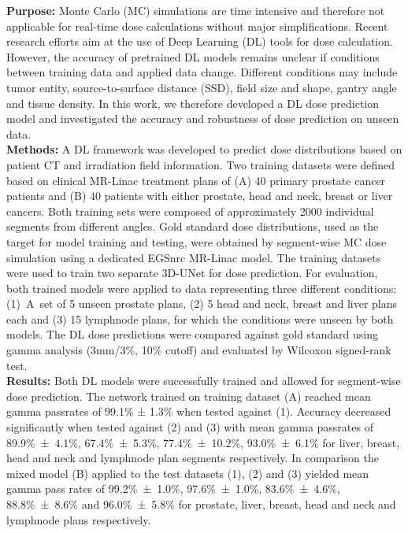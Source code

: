 
\textbf{Purpose:} Monte Carlo (MC) simulations are time intensive and therefore not applicable for real-time dose calculations without major simplifications.  Recent research efforts aim at the use of Deep Learning (DL) tools for dose calculation. 
However, the accuracy of pretrained DL models remains unclear if conditions between training data and applied data change.
Different conditions may include tumor entity, source-to-surface distance (SSD), field size and shape, gantry angle and tissue density. In this work, we therefore developed a DL dose prediction model and investigated the accuracy and robustness of dose prediction on unseen data.\\

\textbf{Methods:} A DL framework was developed to predict dose distributions based on patient CT and irradiation field information. 
Two training datasets were defined based on clinical MR-Linac treatment plans of (A) 40 primary prostate cancer patients and (B) 40 patients with either prostate, head and neck, breast or liver cancers. 
Both training sets were composed of approximately 2000 individual segments from different angles. 
Gold standard dose distributions, used as the target for model training and testing, were obtained by segment-wise MC dose simulation using a dedicated EGSnrc MR-Linac model. 
The training datasets were used to train two separate 3D-UNet for dose prediction. 
For evaluation, both trained models were applied to data representing three different conditions: (1)~A~set of 5 unseen prostate plans, (2) 5 head and neck, breast and liver plans each and (3) 15 lymphnode plans, for which the conditions were unseen by both models. 
The DL dose predictions were compared against gold standard using gamma analysis (3mm/3\%, 10\% cutoff) and evaluated by Wilcoxon signed-rank test.\\

\textbf{Results:} Both DL models were successfully trained and allowed for segment-wise dose prediction.
The network trained on training dataset (A) reached mean gamma passrates of  99.1\% ± 1.3\% when tested against (1).
Accuracy decreased significantly when tested against (2) and (3) with mean gamma passrates of 89.9\%~±~4.1\%, 67.4\%~±~5.3\%, 77.4\%~±~10.2\%, 93.0\%~±~6.1\% for liver, breast, head and neck and lymphnode plan segments respectively.
In comparison the mixed model (B) applied to the test datasets (1), (2) and (3) yielded mean gamma pass rates of 99.2\%~±~1.0\%, 97.6\%~±~1.0\%, 83.6\%~±~4.6\%, 88.8\%~±~8.6\% and 96.0\%~±~5.8\% for prostate, liver, breast, head and neck and lymphnode plans respectively. 